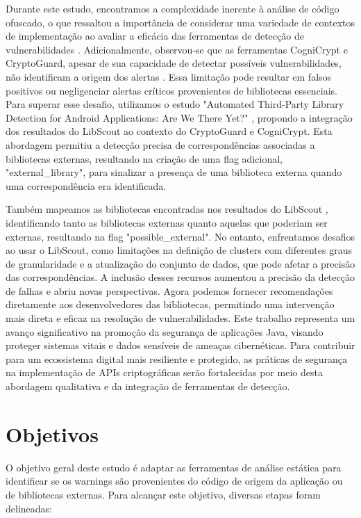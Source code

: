 Durante este estudo, encontramos a complexidade inerente à análise de código ofuscado, o que ressaltou a importância de considerar uma variedade de contextos de implementação ao avaliar a eficácia das ferramentas de detecção de vulnerabilidades \cite{api_tpl_zhang}. Adicionalmente, observou-se que as ferramentas CogniCrypt e CryptoGuard, apesar de sua capacidade de detectar possíveis vulnerabilidades, não identificam a origem dos alertas \cite{perception_developers}. Essa limitação pode resultar em falsos positivos ou negligenciar alertas críticos provenientes de bibliotecas essenciais. Para superar esse desafio, utilizamos o estudo "Automated Third-Party Library Detection for Android Applications: Are We There Yet?" \cite{api_tpl_zhang}, propondo a integração dos resultados do LibScout ao contexto do CryptoGuard e CogniCrypt. Esta abordagem permitiu a detecção precisa de correspondências associadas a bibliotecas externas, resultando na criação de uma flag adicional, "external\_library", para sinalizar a presença de uma biblioteca externa quando uma correspondência era identificada.

Também mapeamos as bibliotecas encontradas nos resultados do LibScout \cite{LibScout}, identificando tanto as bibliotecas externas quanto aquelas que poderiam ser externas, resultando na flag "possible\_external". No entanto, enfrentamos desafios ao usar o LibScout, como limitações na definição de clusters com diferentes graus de granularidade e a atualização do conjunto de dados, que pode afetar a precisão das correspondências. A inclusão desses recursos aumentou a precisão da detecção de falhas e abriu novas perspectivas. Agora podemos fornecer recomendações diretamente aos desenvolvedores das bibliotecas, permitindo uma intervenção mais direta e eficaz na resolução de vulnerabilidades. Este trabalho representa um avanço significativo na promoção da segurança de aplicações Java, visando proteger sistemas vitais e dados sensíveis de ameaças cibernéticas. Para contribuir para um ecossistema digital mais resiliente e protegido, as práticas de segurança na implementação de APIs criptográficas serão fortalecidas por meio desta abordagem qualitativa e da integração de ferramentas de detecção.

\section{Objetivos}

O objetivo geral deste estudo é adaptar as ferramentas de análise estática para identificar se os warnings são provenientes do código de origem da aplicação ou de bibliotecas externas. Para alcançar este objetivo, diversas etapas foram delineadas:

